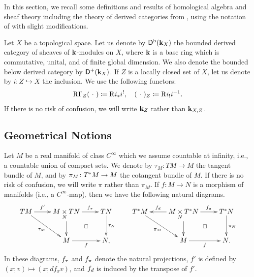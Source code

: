 In this section, 
we recall some definitions and results of 
homological algebra and sheaf theory including 
the theory of derived categories from \cite{KS90}, 
using the notation of \cite{KS90} with slight modifications. 

Let \(X\) be a topological space. 
Let us denote by \(\Dompb(\kk_X)\) the bounded 
derived category of sheaves of \(\kk\)-modules on \(X\), 
where \(\kk\) is a base ring which is commutative, 
unital, and of finite global dimension. 
We also denote the bounded below derived category  
by \(\Dompl(\kk_X)\). 
If \(Z\) is a locally closed set of \(X\), 
let us denote by \(i\colon Z\hookrightarrow X\) the inclusion. 
We use the following functors: 
\[
  \RG_{Z}(\blk) \coloneqq \Rder[]{i_{\ast}}i^{!}, 
  \quad
  (\blk)_{Z}\coloneqq \Rder[]{i_{!}}i^{-1}.
\]
If there is no risk of confusion, 
we will write \(\kk_Z\) rather than \(\kk_{X,Z}\).

\subsection{Geometrical Notions}

Let \(M\) be a real manifold of class \(C^\infty\) 
which we assume countable at infinity, i.e., a countable union of compact sets. 
We denote by \(\tau_{M}\colon TM\to M\) 
the tangent bundle of \(M\), 
and by \(\pi_{M}\colon \cotb[M] \to M\) 
the cotangent bundle of \(M\). 
If there is no risk of confusion, 
we will write \(\pi\) rather than \(\pi_{M}\). 
If \(f\colon M\to N\) is a morphism of manifolds 
(i.e., a \(C^{\infty}\)-map), 
then we have the following natural diagrams. 
\[\vcenter{\xymatrix{
  TM
    \ar[r]^-{f'}
    \ar[rd]_-{\tau_M} 
  &
  M\dpb[N]TN
    \ar[r]^-{\mptan[f]}
    \ar[d]
    \ar@{}[dr]|\square
  & 
  TN
    \ar[d]^-{\tau_N}
  &
  \cotb[M]
    \ar[rd]_-{\pi_M}
  &
  M\dpb[N]\cotb[N]
    \ar[l]_-{\mdiff[f]}
    \ar[r]^-{\mpb[f]}
    \ar[d]
    \ar@{}[dr]|\square
  &
  \cotb[N]
    \ar[d]^{\pi_N}
  \\
  &
  M
    \ar[r]_-{f}
  &
  N,
  &
  &
  M
    \ar[r]_-{f}
  &
  N.
}}\]
In these diagrams, 
\(\mptan[f]\) and \(\mpb[f]\) denote 
the natural projections, \(f'\) is defined by 
\((x;v)\mapsto (x;df_{x}v)\), 
and \(\mdiff[f]\) is induced by the transpose of \(f'\). 

